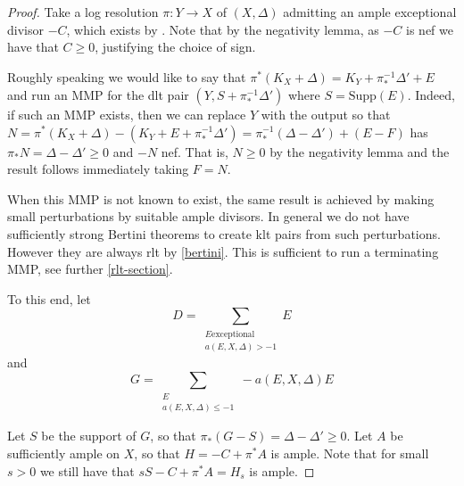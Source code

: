 \begin{proof}
	
	
	Take a log resolution $\pi\colon Y \to X$ of $(X,\Delta)$ admitting an ample exceptional divisor $-C$, which exists by \cite[Theorem 1]{kollar2021resolution}. Note that by the negativity lemma, as $-C$ is nef we have that $C \geq 0$, justifying the choice of sign.
	
	Roughly speaking we would like to say that $\pi^{*}(K_{X}+\Delta)=K_{Y}+\pi_{*}^{-1}\Delta'+E$ and run an MMP for the dlt pair $(Y,S+\pi_{*}^{-1}\Delta')$ where $S=\text{Supp}(E)$. Indeed, if such an MMP exists, then we can replace $Y$ with the output so that $N=\pi^{*}(K_{X}+\Delta)-(K_{Y}+E+\pi_{*}^{-1}\Delta')= \pi_{*}^{-1}(\Delta-\Delta')+(E-F)$ has $\pi_{*}N=\Delta-\Delta' \geq 0$ and $-N$ nef. That is, $N \geq 0$ by the negativity lemma and the result follows immediately taking $F=N$.  
	
	When this MMP is not known to exist, the same result is achieved by making small perturbations by suitable ample divisors. In general we do not have sufficiently strong Bertini theorems to create klt pairs from such perturbations. However they are always rlt by \autoref{bertini}. This is sufficient to run a terminating MMP, see further \autoref{rlt-section}.
	
	To this end, let \[D= \sum_{\substack{E \text{exceptional} \\ a(E,X,\Delta) > -1}} E\]
	and 
		\[G = \sum_{\substack{E \\ a(E,X,\Delta) \leq  -1}} -a(E,X,\Delta)E\]
		
	Let $S$ be the support of $G$, so that $\pi_{*}(G-S)=\Delta-\Delta' \geq 0.$ Let $A$ be sufficiently ample on $X$, so that $H=-C+\pi^{*}A$ is ample. Note that for small $s > 0$ we still have that $sS -C+\pi^{*}A=H_{s}$ is ample.
	

\end{proof}
